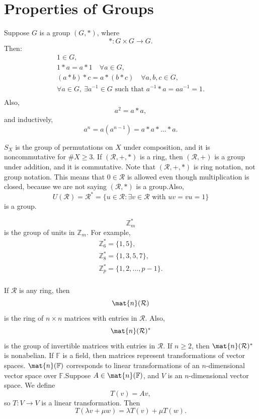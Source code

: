 
\section{Properties of Groups}

\begin{definition}
    Suppose $G$ is a group $(G,*)$, where
    \[
        *:G\times G\to G.
    \]
    Then:
    \begin{gather*}
        1\in G,\\
        1*a = a*1 \quad \forall a\in G,\\
        (a*b)*c = a*(b*c) \quad \forall a,b,c\in G,\\
        \forall a\in G,\ \exists a^{-1}\in G \text{ such that } a^{-1}*a = aa^{-1} = 1.\\
    \end{gather*}
    Also,
    \[
        a^2 = a*a,
    \]
    and inductively,
    \[
        a^n = a(a^{n-1}) = a*a*\dots*a.
    \]
\end{definition}

$S_X$ is the group of permutations on $X$ under composition, and it is noncommutative for $\#X\geq 3$.
If $(\mathcal{R},+,*)$ is a ring, then $(\mathcal{R},+)$ is a group under addition, and it is commutative.
Note that $(\mathcal{R},+,*)$ is ring notation, not group notation.
This means that $0\in \mathcal{R}$ is allowed even though multiplication is closed, because we are not saying $(\mathcal{R},*)$ is a group.Also,
\[
    U(\mathcal{R}) = \mathcal{R}^* = \{u\in \mathcal{R} : \exists v\in \mathcal{R} \text{ with } uv=vu=1\}
\]
is a group.

\begin{example}
    \[
        \mathbb{Z}_m^*
    \]
    is the group of units in $\mathbb{Z}_m$.
    For example,
    \begin{gather*}
        \mathbb{Z}_6^* = \{1,5\},\\
        \mathbb{Z}_8^* = \{1,3,5,7\},\\
        \mathbb{Z}_p^* = \{1,2,\dots,p-1\}.\\
    \end{gather*}
\end{example}

If $\mathcal{R}$ is any ring, then
\[
    \mat{n}(\mathcal{R})
\]
is the ring of $n\times n$ matrices with entries in $\mathcal{R}$.
Also,
\[
    \mat{n}(\mathcal{R})^*
\]
is the group of invertible matrices with entries in $\mathcal{R}$.
If $n\geq 2$, then $\mat{n}(\mathcal{R})^*$ is nonabelian.
If $\mathbb{F}$ is a field, then matrices represent transformations of vector spaces.
$\mat{n}(\mathbb{F})$ corresponds to linear transformations of an $n$-dimensional vector space over $\mathbb{F}$.Suppose $A\in \mat{n}(\mathbb{F})$, and $V$ is an $n$-dimensional vector space.
We define
\[
    T(v)=Av,
\]
so $T:V\to V$ is a linear transformation.
Then
\[
    T(\lambda v+\mu w)=\lambda T(v)+\mu T(w).
\]


